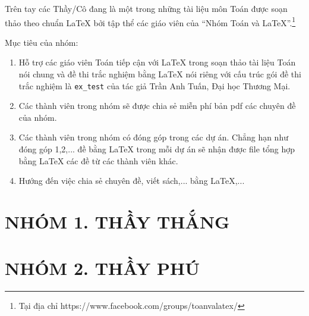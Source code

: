 \documentclass[12pt,a4paper,oneside]{book}
\begin{document}
	\noindent Trên tay các Thầy/Cô đang là một trong những tài liệu môn Toán được soạn thảo theo chuẩn \LaTeX{} bởi tập thể các giáo viên của ``Nhóm Toán và LaTeX''.\footnote{Tại địa chỉ https://www.facebook.com/groups/toanvalatex/}
	
	\vspace{0.6cm}
	
	\noindent Mục tiêu của nhóm: 
	\begin{enumerate}
		\item Hỗ trợ các giáo viên Toán tiếp cận với \LaTeX{} trong soạn thảo tài liệu Toán nói chung và đề thi trắc nghiệm bằng \LaTeX{} nói riêng với cấu trúc gói đề thi trắc nghiệm là \texttt{ex\_test} của tác giả Trần Anh Tuấn, Đại học Thương Mại.
		\item Các thành viên trong nhóm sẽ được chia sẻ miễn phí bản pdf  các chuyên đề của nhóm.
		\item Các thành viên trong nhóm có đóng góp trong các dự án. Chẳng hạn như đóng góp 1,2,... đề bằng \LaTeX{} trong mỗi dự án sẽ nhận được file tổng hợp bằng \LaTeX{} các đề từ các thành viên khác.
		\item Hướng đến việc chia sẻ chuyên đề, viết sách,... bằng \LaTeX,...
	\end{enumerate}

\chapter{NHÓM 1. THẦY THẮNG}

\newpage
\newpage
\newpage
\newpage
\newpage
\newpage
\newpage
\newpage
\newpage
\newpage
\newpage
\newpage
\chapter{NHÓM 2. THẦY PHÚ}

\newpage
\newpage
\newpage
\newpage
\newpage%
\newpage
\newpage
\newpage
\newpage
\newpage
\newpage
\newpage
\newpage
\end{document}
